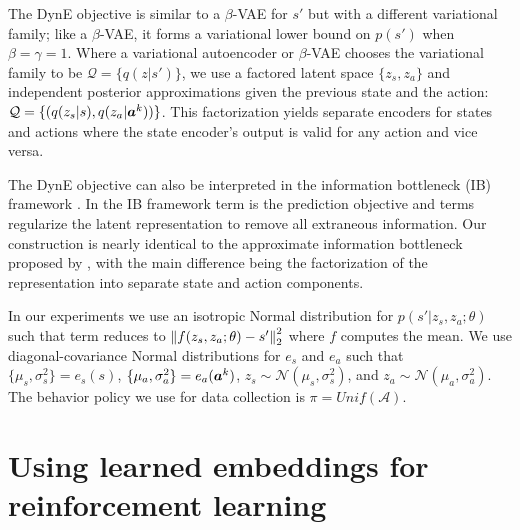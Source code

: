 The DynE objective is similar to a $\beta$-VAE \citep{higgins2017beta} for $s'$ but with a different variational family; like a $\beta$-VAE, it forms a variational lower bound on $p(s')$ when $\beta = \gamma = 1$.
Where a variational autoencoder \citep{kingma2013auto,rezende2014stochastic} or $\beta$-VAE chooses the variational family to be $\mathcal{Q} = \{q(z | s')\}$, we use a factored latent space $\{ z_s, z_a \}$ and independent posterior approximations given the previous state and the action: $\mathcal{Q} = \{ (q(z_s | s), q(z_a | {\bm{a}}^k)) \}$.
This factorization yields separate encoders for states and actions where the state encoder's output is valid for any action and vice versa.


The DynE objective can also be interpreted in the information bottleneck (IB) framework \citep{tishby2000information}.
In the IB framework term  is the prediction objective and terms  regularize the latent representation to remove all extraneous information.
Our construction is nearly identical to the approximate information bottleneck proposed by \citet{alemi2016deep}, with the main difference being the factorization of the representation into separate state and action components.

In our experiments we use an isotropic Normal distribution for $p(s' | z_s, z_a; \theta)$ such that term  reduces to $\left\lVert f(z_s, z_a; \theta) - s'\right\rVert_2^2$ where $f$ computes the mean.
We use diagonal-covariance Normal distributions for $e_s$ and $e_a$ such that $\{\mu_s, \sigma_s^2\} = e_s(s)$, $\{\mu_a, \sigma_a^2\} = e_a({\bm{a}}^k)$, $z_s \sim \mathcal{N}(\mu_s, \sigma_s^2)$, and $z_a \sim \mathcal{N}(\mu_a, \sigma_a^2)$.
The behavior policy we use for data collection is $\pi = Unif(\mathcal{A})$.



\section{Using learned embeddings for reinforcement learning}

